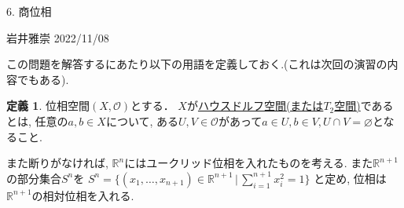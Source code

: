 \documentclass[dvipdfmx,a4paper,11pt]{article}
\newcommand{\R}{\mathbb{R}}
\theoremstyle{definition}
\newtheorem{dfn}[thm]{定義}
\begin{document}

\begin{center}
{\Large 6. 商位相}
\end{center}

\begin{flushright}
 岩井雅崇 2022/11/08
\end{flushright}

この問題を解答するにあたり以下の用語を定義しておく.(これは次回の演習の内容でもある).
   \begin{tcolorbox}[
    colback = white,
    colframe = green!35!black,
    fonttitle = \bfseries,
    breakable = true]
    \begin{dfn}
位相空間$(X, \mathscr{O})$とする．
$X$が\underline{ハウスドルフ空間(または$T_2$空間)}であるとは, 任意の$a, b \in X$について, ある$U, V \in \mathscr{O}$があって$a \in U, b \in V, U \cap V = \varnothing $となること.
  \end{dfn}
 \end{tcolorbox}
 
また断りがなければ, $\R^{n}$にはユークリッド位相を入れたものを考える. また$\R^{n+1}$の部分集合$S^n$を
$S^n = \{ (x_1, \ldots, x_{n+1}) \in \R^{n+1} \, |\,\sum_{i=1}^{n+1} x_{i}^{2} =1\}$
と定め, 位相は$\R^{n+1}$の相対位相を入れる. 
\end{document}
